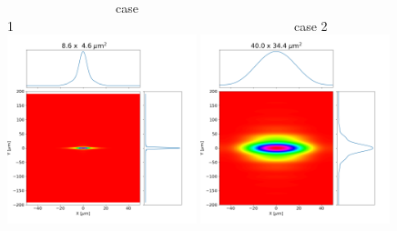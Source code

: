 \documentclass[]{article}
\begin{document}
  

\thispagestyle{empty}




\begin{figure}\label{fig:srw}
    ~~~~~~~~~~~~~~~~~case 1~~~~~~~~~~~~~~~~~~~~~~~~~~~~~~~~~~~~~~~~~~~~case 2\\
    \includegraphics[width=0.49\textwidth]{figures/case1_srw.png}
    \includegraphics[width=0.49\textwidth]{figures/case2_srw.png}\\
    

\end{figure}
\end{document}
